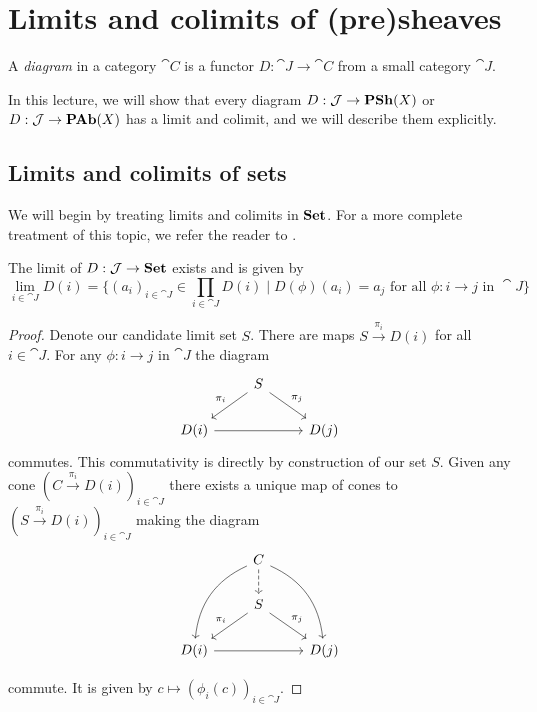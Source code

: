 \documentclass[../main.tex]{subfiles}
\begin{document}
\chapter{Limits and colimits of (pre)sheaves}\label{lecture:7}
\begin{defn}
    A \emph{diagram} in a category $\cat C$ is a functor $D: \cat J \to \cat C$ from a small category $\cat J$.
\end{defn}

In this lecture, we will show that every diagram $D: \mathcal{J} \to \operatorname{\mathbf{PSh}}(X)$ or $D: \mathcal{J} \to \operatorname{\mathbf{PAb}}(X)$ has a limit and colimit, and we will describe them explicitly.

\section{Limits and colimits of sets}

We will begin by treating limits and colimits in $\mathbf{Set}$. For a more complete treatment of this topic, we refer the reader to \cite[\S~3.2]{riehlCategoryTheoryContext2016}.
\begin{prop}
    The limit of $D: \mathcal{J} \to \mathbf{Set}$ exists and is given by \[
        \lim_{i\in \cat J}D(i) = \{(a_i)_{i \in \cat J} \in \prod_{i \in \cat J}D(i) \mid D(\phi)(a_i) = a_j \text{ for all } \phi: i \to j \text{ in } \cat J\}
    \]
\end{prop}
\begin{proof}
	Denote our candidate limit set $S$. There are maps $S \xrightarrow{\pi_i} D(i)$ for all $i \in \cat J$. For any $\phi: i \to j$ in $\cat J$ the diagram
    \[
      \begin{tikzcd}
                & S \arrow[ld, "\pi_i"'] \arrow[rd, "\pi_j"] &      \\
D(i) \arrow[rr] &                                            & D(j)
\end{tikzcd}
    \]
commutes. This commutativity is directly by construction of our set $S$. Given any cone $(C \xrightarrow{\pi_i} D(i))_{i \in \cat J}$ there exists a unique map of cones to $(S \xrightarrow{\pi_i} D(i))_{i \in \cat J}$ making the diagram
\[
\begin{tikzcd}
                & C \arrow[ldd, bend right] \arrow[rdd, bend left] \arrow[d, dashed] &      \\
                & S \arrow[ld, "\pi_i"'] \arrow[rd, "\pi_j"]                         &      \\
D(i) \arrow[rr] &                                                                    & D(j)
\end{tikzcd}
\]

commute. It is given by $c \mapsto (\phi_i(c))_{i \in \cat J}$.

\end{proof}
\end{document}
